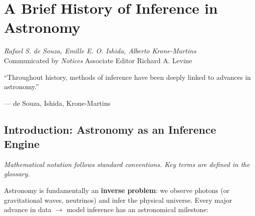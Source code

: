 \chapter{A Brief History of Inference in Astronomy}
\label{ch:astronomy} \cite{desouza2025astronomy}

\begin{flushright}
\textit{Rafael S. de Souza, Emille E. O. Ishida, Alberto Krone-Martins}\\
Communicated by \textit{Notices} Associate Editor Richard A. Levine
\end{flushright}

\epigraph{``Throughout history, methods of inference have been deeply linked to advances in astronomy.''}{--- de Souza, Ishida, Krone-Martins} \cite{desouza2025astronomy}

\begin{abstract}
From Hipparchus averaging solstice times to Hamiltonian Monte Carlo sampling cosmological parameters, astronomy has driven the development of statistical inference. This chapter traces the arc: least squares (Gauss/Ceres), Bayesian revival (Jeffreys), MCMC (cosmology), to modern likelihood-free and amortized inference. The lesson: astronomical data challenges force statistical innovation, \cite{desouza2025astronomy}.
\end{abstract}

\section{Introduction: Astronomy as an Inference Engine}

\noindent\textit{Mathematical notation follows standard conventions. Key terms are defined in the glossary.}\n
\label{sec:astro:intro}

Astronomy is fundamentally an \textbf{inverse problem}: we observe photons (or gravitational waves, neutrinos) and infer the physical universe. Every major advance in data $\to$ model inference has an astronomical milestone: \cite{desouza2025astronomy}

